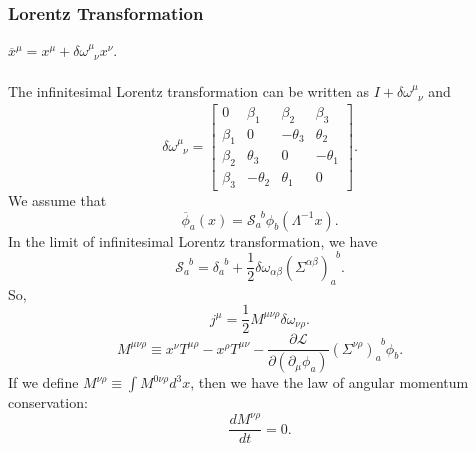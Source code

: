 \subsubsection{Lorentz Transformation}
$\overline{x}^{\mu} = x^{\mu} + \delta \omega^{\mu}_{\phantom{\mu}\nu} x^{\nu}$.
\\ \\
The infinitesimal Lorentz transformation can be written as $I+\delta \omega^{\mu}_{\phantom{\mu}\nu}$ and
\[\delta \omega^{\mu}_{\phantom{\mu}\nu} = \left[ 
\begin{matrix} 
0       & \beta_1   & \beta_2   & \beta_3   \\ 
\beta_1 & 0         & -\theta_3 & \theta_2  \\
\beta_2 & \theta_3  & 0         & -\theta_1 \\
\beta_3 & -\theta_2 & \theta_1  & 0
\end{matrix} 
\right].\]
We assume that
\[\overline{\phi}_a(x) = \mathscr{S}_{a}^{\phantom{a}b}\phi_b(\Lambda^{-1}x).\]
In the limit of infinitesimal Lorentz transformation, we have
\[\mathscr{S}_{a}^{\phantom{a}b} = \delta_{a}^{\phantom{a}b}+\frac{1}{2} \delta \omega_{\alpha \beta} (\Sigma^{\alpha \beta})_{a}^{\phantom{a}b} .\]
So,
\[j^{\mu} = \frac{1}{2} M^{\mu \nu \rho}  \delta \omega_{\nu \rho}.\]
\[M^{\mu \nu \rho} \equiv x^{\nu}T^{\mu \rho} - x^{\rho} T^{\mu \nu} - \frac{\partial \mathcal{L}}{\partial (\partial_{\mu}\phi_a)}(\Sigma^{\nu \rho})_{a}^{\phantom{a}b}\phi_b.\]
If we define $M^{\nu \rho} \equiv \int M^{0 \nu \rho} d^3 x$, then we have the law of angular momentum conservation:
\[\frac{dM^{\nu \rho}}{dt} = 0.\]

